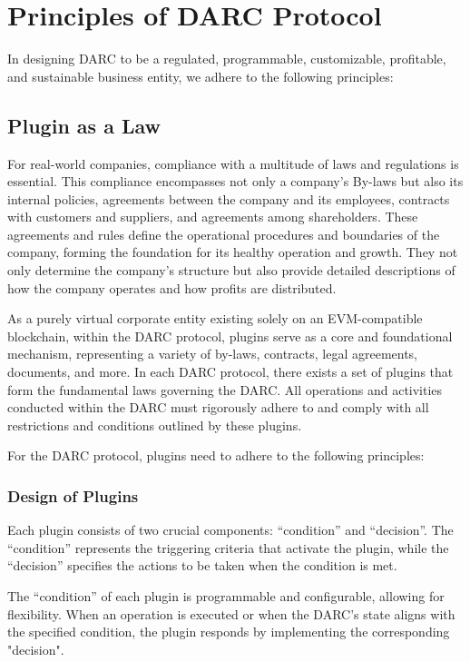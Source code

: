 \documentclass[main.tex]{subfiles}
\begin{document}
\section{Principles of DARC Protocol}

In designing DARC to be a regulated, programmable, customizable, profitable, and sustainable business entity, we adhere to the following principles:

\subsection{Plugin as a Law}

For real-world companies, compliance with a multitude of laws and regulations is essential. This compliance encompasses not only a company's By-laws but also its internal policies, agreements between the company and its employees, contracts with customers and suppliers, and agreements among shareholders. These agreements and rules define the operational procedures and boundaries of the company, forming the foundation for its healthy operation and growth. They not only determine the company's structure but also provide detailed descriptions of how the company operates and how profits are distributed.


As a purely virtual corporate entity existing solely on an EVM-compatible blockchain, within the DARC protocol, plugins serve as a core and foundational mechanism, representing a variety of by-laws, contracts, legal agreements, documents, and more. In each DARC protocol, there exists a set of plugins that form the fundamental laws governing the DARC. All operations and activities conducted within the DARC must rigorously adhere to and comply with all restrictions and conditions outlined by these plugins.

For the DARC protocol, plugins need to adhere to the following principles:

\subsubsection{Design of Plugins}

Each plugin consists of two crucial components: ``condition'' and ``decision''. The ``condition'' represents the triggering criteria that activate the plugin, while the ``decision'' specifies the actions to be taken when the condition is met. 
    
    The ``condition'' of each plugin is programmable and configurable, allowing for flexibility. When an operation is executed or when the DARC's state aligns with the specified condition, the plugin responds by implementing the corresponding "decision".
\end{document}
